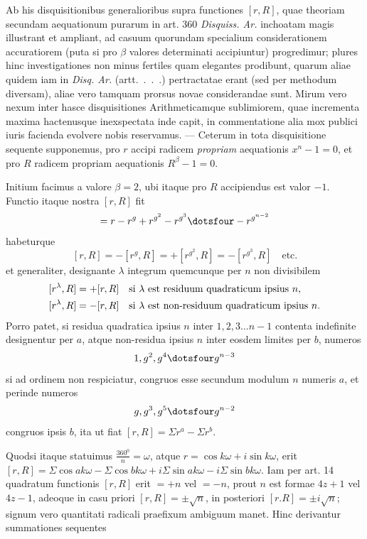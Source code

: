Ab his disquisitionibus generalioribus supra functiones $[r,R]$, quae theoriam secundam aequationum purarum in art. 360 \emph{Disquiss. Ar.} inchoatam magis illustrant et ampliant, ad casuum quorundam specialium considerationem accuratiorem (puta si pro $\beta$ valores determinati accipiuntur) progredimur; plures hinc investigationes non minus fertiles quam elegantes prodibunt, quarum aliae quidem iam in \emph{Disq. Ar.} (artt.\ .\ .\ .) pertractatae erant (sed per methodum diversam), aliae vero tamquam prorsus novae considerandae sunt. Mirum vero nexum inter hasce disquisitiones Arithmeticamque sublimiorem, quae incrementa maxima hactenusque inexspectata inde capit, in commentatione alia mox publici iuris facienda evolvere nobis reservamus. — Ceterum in tota disquisitione sequente supponemus, pro $r$ accipi radicem \emph{propriam} aequationis $x^n-1=0$, et pro $R$ radicem propriam aequationis $R^\beta-1=0$.

Initium facimus a valore $\beta=2$, ubi itaque pro $R$ accipiendus est valor $-1$. Functio itaque nostra $[r,R]$ fit
\[
=r-r^g+r^{g^2}-r^{g^3}\dotsfour-r^{g^{n-2}}
\]
habeturque
\[
[r,R]=-[r^g,R]=+[r^{g^2},R]=-[r^{g^3},R]\quad\text{etc.}
\]
et generaliter, designante $\lambda$ integrum quemcunque per $n$ non divisibilem
\[
\begin{aligned}
[r^\lambda,R]&=+[r,R]\quad\text{si }\lambda\text{ est residuum quadraticum ipsius }n,\\
\relax[r^\lambda,R]&=-[r,R]\quad\text{si }\lambda\text{ est non-residuum quadraticum ipsius }n.
\end{aligned}
\]
Porro patet, si residua quadratica ipsius $n$ inter $1,2,3\dots n-1$ contenta indefinite designentur per $a$, atque non-residua ipsius $n$ inter eosdem limites per $b$, numeros
\[
1,g^2,g^4\dotsfour g^{n-3}
\]
si ad ordinem non respiciatur, congruos esse secundum modulum $n$ numeris $a$, et perinde numeros
\[
g,g^3,g^5\dotsfour g^{n-2}
\]
congruos ipsis $b$, ita ut fiat $[r,R]=\Sigma r^a-\Sigma r^b$.

Quodsi itaque statuimus $\frac{360^0}n=\omega$, atque $r=\cos k\omega+i\sin k\omega$, erit $[r,R]=\Sigma\cos ak\omega-\Sigma\cos bk\omega+i\Sigma\sin ak\omega-i\Sigma\sin bk\omega$. Iam per art. 14 quadratum functionis $[r,R]$ erit $=+n$ vel $=-n$, prout $n$ est formae $4z+1$ vel $4z-1$, adeoque in casu priori $[r,R]=\pm\surd n$, in posteriori $[r.R]=\pm i\surd n$; signum vero quantitati radicali praefixum ambiguum manet. Hinc derivantur summationes sequentes

